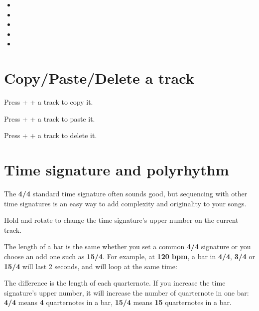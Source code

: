 \begin{itemize}
\item {}
\item {}
\item {}
\item {}
\item {}
\end{itemize}


\section{Copy/Paste/Delete a track}

Press  +  + a track \padsicon{} to copy it.

Press  +  + a track \padsicon{} to paste it.


Press  +  + a track \padsicon{} to delete it.


\section{Time signature and polyrhythm}

The \textbf{4/4} standard time signature often sounds good, but sequencing with other time signatures is an easy way to add complexity and originality to your songs.


Hold  and rotate \encodericon{} to change the time signature's upper number on the current track.

The length of a bar is the same whether you set a common \textbf{4/4} signature or you choose an odd one such as \textbf{15/4}. For example, at \textbf{120 bpm}, a bar in \textbf{4/4}, \textbf{3/4} or \textbf{15/4} will last 2 seconds, and will loop at the same time:


The difference is the length of each quarternote. If you increase the time signature's upper number, it will increase the number of quarternote in one bar: \textbf{4/4} means \textbf{4} quarternotes in a bar, \textbf{15/4} means \textbf{15} quarternotes in a bar.

